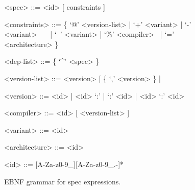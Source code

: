 \begin{figure}
\begin{grammar}
  <spec>         ::= <id> [ constraints ]

  <constraints>   ::= \{ `@' <version-list> | `+' <variant> \newline
                   | `-' <variant> ~~~| `~' <variant> \newline
                   | `\%' <compiler> ~| `=' <architecture> \} 

  <dep-list>  ::= \{ `\textsf \textasciicircum' <spec> \}

  <version-list> ::= <version> [ \{ `,' <version> \} ]

  <version>      ::= <id> | <id> `:' | `:' <id> | <id> `:' <id>

  <compiler>     ::= <id> [ <version-list> ]

  <variant>      ::= <id>

  <architecture> ::= <id>

  <id>           ::= [A-Za-z0-9_][A-Za-z0-9_.-]*
\end{grammar}
\caption{
	EBNF grammar for spec expressions.
	\label{fig:grammar}
}
\end{figure}


